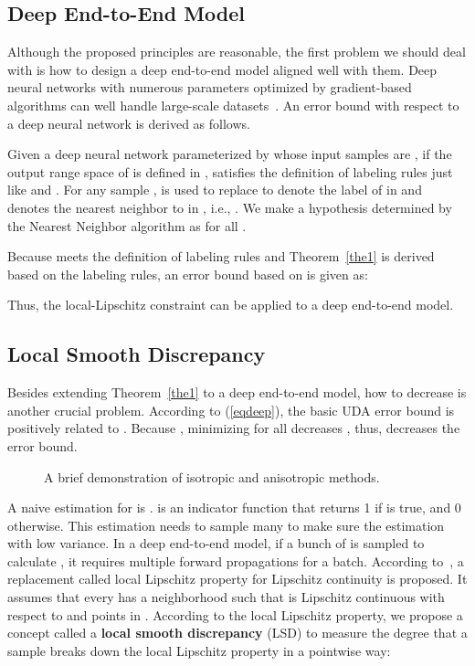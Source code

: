 \documentclass[journal,twocolumn]{IEEEtran}
\theoremstyle{definition}
\begin{document}
\subsection{Deep End-to-End Model}
\label{deep}

Although the proposed principles are reasonable, the first problem we should deal with is how to design a deep end-to-end model aligned well with them. Deep neural networks with numerous parameters optimized by gradient-based algorithms can well handle large-scale datasets~\cite{krizhevsky2012imagenet}. An error bound with respect to a deep neural network is  derived as follows.

Given a deep neural network  parameterized by  whose input samples are , if the output range space of  is defined in ,  satisfies the definition of labeling rules just like  and . For any sample ,  is used to replace  to denote the label of  in  and  denotes the nearest neighbor to  in , i.e., . We make a hypothesis determined by the Nearest Neighbor algorithm as  for all .

 Because  meets the definition of labeling rules and Theorem~\ref{the1} is derived based on the labeling rules, an error bound based on  is given as:

Thus, the local-Lipschitz constraint can be applied to a deep end-to-end model.



\subsection{Local Smooth Discrepancy}

Besides extending Theorem~\ref{the1} to a deep end-to-end model, how to decrease  is another crucial problem. According to (\ref{eqdeep}), the basic UDA error bound is positively related to .  Because , minimizing   for all  decreases , thus, decreases the error bound.

\begin{figure}[h]
  \centering
\caption{A brief demonstration of isotropic and anisotropic methods.}
  \label{fig:plans} \end{figure} 

A naive estimation for  is .  is an indicator function that returns 1 if  is true, and 0 otherwise. This estimation needs to sample many  to make sure the estimation with low variance. In a deep end-to-end model, if a bunch of  is sampled to calculate , it requires multiple forward propagations for a batch. According to~\cite{grandvalet2004semi-supervised}, a replacement called local Lipschitz property for Lipschitz continuity is proposed. It assumes that every  has a neighborhood  such that  is Lipschitz continuous with respect to  and points in . According to the local Lipschitz property, we propose a concept called a {\bf local smooth discrepancy} (LSD) to measure the degree that a sample  breaks down the local Lipschitz property in a pointwise way:
\end{document}
